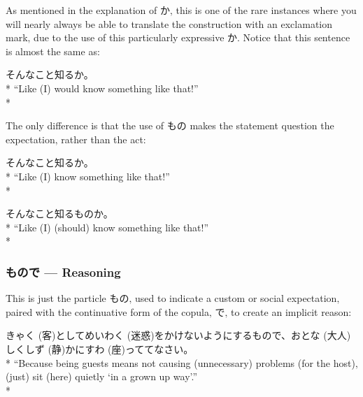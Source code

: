 \documentclass[11pt, b5paper, twoside, openright, onecolumn]{book}
\makeatletter
\newcommand*{\rubystack}[2]{{\relscale{0.5}%
  \begin{tabular}[b]{@{}c@{}}%
    {#1}\\%
   {\textscale{2}{#2}}%
  \end{tabular}}%
}
\DeclareRobustCommand*{\ruby}[2]{%
  \mbox{%
    \setlength{\parskip}{0ex}%
    \BeginAccSupp{method=pdfstringdef,ActualText={#1}}%
      \rubystack{\phantom{#2}}{#1}%
      \llap{%
        \rubystack{#2}{\phantom{#1}}%
      }%
    \EndAccSupp{}%
  }%
}
\renewcommand*{\ruby}[2]{#2 (#1)}%
\newenvironment{exampleblock}{
\setlength{\parindent}{0.6in}
\begin{minipage}[t]{\dimexpr\textwidth-\parindent}}
{\end{minipage}}
\makeatother
\begin{document}
As mentioned in the explanation of か‚ this is one of the rare instances where you will nearly always be able to translate the construction with an exclamation mark‚ due to the use of this particularly expressive か. Notice that this sentence is almost the same as:

\vspace{0.4cm}
\begin{exampleblock}
そんなこと知るか。 \\* 
“Like (I) would know something like that!” \\* 
\end{exampleblock}
\vspace{0.2cm}

The only difference is that the use of もの makes the statement question the expectation‚ rather than the act:

\vspace{0.4cm}
\begin{exampleblock}
そんなこと知るか。 \\* 
“Like (I) know something like that!” \\* 
\end{exampleblock}
\vspace{0.2cm}

\begin{exampleblock}
そんなこと知るものか。 \\* 
“Like (I) (should) know something like that!” \\* 
\end{exampleblock}
\subsubsection{もので — Reasoning}


This is just the particle もの‚ used to indicate a custom or social expectation‚ paired with the continuative form of the copula‚ で‚ to create an implicit reason:

\vspace{0.4cm}
\begin{exampleblock}
\ruby{客}{きゃく}として\ruby{迷惑}{めいわく}をかけないようにするもので、\ruby{大人}{おとな}しく\ruby{静}{しず}かに\ruby{座}{すわ}っててなさい。 \\* 
“Because being guests means not causing (unnecessary) problems (for the host)‚ (just) sit (here) quietly ‘in a grown up way’.” \\* 
\end{exampleblock}
\end{document}
